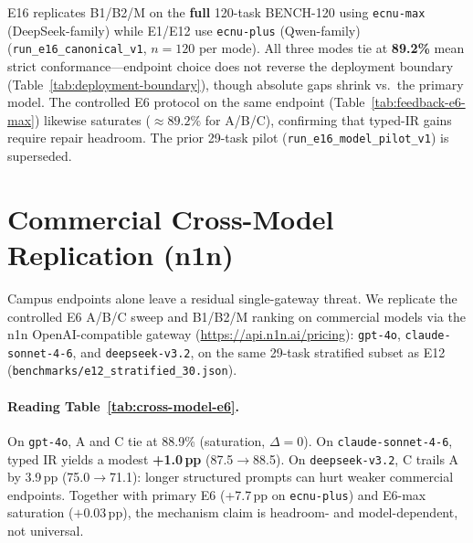 E16 replicates B1/B2/M on the \textbf{full} 120-task BENCH-120 using
\texttt{ecnu-max} (DeepSeek-family) while E1/E12 use \texttt{ecnu-plus}
(Qwen-family) (\texttt{run\_e16\_canonical\_v1}, $n{=}120$ per mode).
All three modes tie at \textbf{89.2\%} mean strict conformance---endpoint
choice does not reverse the deployment boundary
(Table~\ref{tab:deployment-boundary}), though absolute gaps shrink vs.\ the
primary model.
The controlled E6 protocol on the same endpoint
(Table~\ref{tab:feedback-e6-max}) likewise saturates (${\approx}89.2\%$ for
A/B/C), confirming that typed-IR gains require repair headroom.
The prior 29-task pilot (\texttt{run\_e16\_model\_pilot\_v1}) is superseded.

\begin{table}[H]
  \caption{E16 second-model replication (\texttt{ecnu-max}, $n{=}120$).}
  \label{tab:e16-canonical}
  \centering
\end{table}

\section{Commercial Cross-Model Replication (n1n)}
\label{sec:results:n1n}

Campus endpoints alone leave a residual single-gateway threat.
We replicate the controlled E6 A/B/C sweep and B1/B2/M ranking on commercial
models via the n1n OpenAI-compatible gateway
(\url{https://api.n1n.ai/pricing}): \texttt{gpt-4o},
\texttt{claude-sonnet-4-6}, and \texttt{deepseek-v3.2}, on the same
29-task stratified subset as E12
(\texttt{benchmarks/e12\_stratified\_30.json}).



\paragraph{Reading Table~\ref{tab:cross-model-e6}.}
On \texttt{gpt-4o}, A and C tie at 88.9\% (saturation, $\Delta{=}0$).
On \texttt{claude-sonnet-4-6}, typed IR yields a modest
\textbf{+1.0\,pp} (87.5$\rightarrow$88.5).
On \texttt{deepseek-v3.2}, C trails A by 3.9\,pp (75.0$\rightarrow$71.1):
longer structured prompts can hurt weaker commercial endpoints.
Together with primary E6 (+7.7\,pp on \texttt{ecnu-plus}) and E6-max
saturation (${+}0.03$\,pp), the mechanism claim is headroom- and
model-dependent, not universal.

